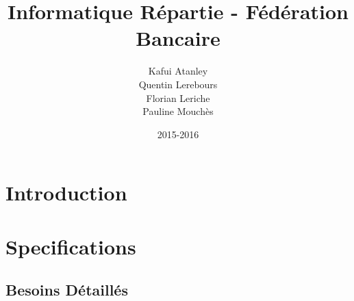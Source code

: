 \documentclass[a4paper,10pt]{report}
\title{Informatique Répartie - Fédération Bancaire}
\date{2015-2016}
\author{Kafui Atanley \\ Quentin Lerebours \\ Florian Leriche \\ Pauline Mouchès}
\begin{document}
\maketitle
\tableofcontents
\chapter{Introduction}

\chapter{Specifications}
\section{Besoins Détaillés}
\end{document}
